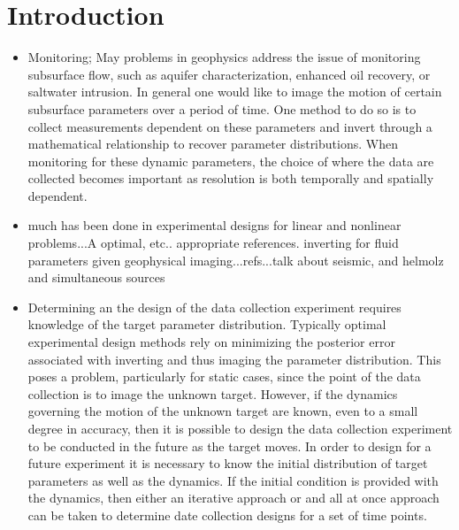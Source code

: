 \documentclass[12pt]{article}
\begin{document}
\section{Introduction} 
\begin{itemize}

\item Monitoring; May problems in geophysics address the issue of monitoring subsurface flow, such as aquifer characterization, enhanced oil recovery, or saltwater intrusion. In general one would like to image the motion of certain subsurface parameters over a period of time.  One method to do so is to collect measurements dependent on these parameters and invert through a mathematical relationship to recover parameter distributions. When monitoring for these dynamic parameters, the choice of where the data are collected becomes important as resolution is both temporally and spatially dependent. 

\item much has been done in experimental designs for linear and nonlinear problems...A optimal, etc.. appropriate references. inverting for fluid parameters given geophysical imaging...refs...talk about seismic, and helmolz and simultaneous sources

\item Determining an the design of the data collection experiment requires knowledge of the target parameter distribution. Typically optimal experimental design methods rely on minimizing the posterior error associated with inverting and thus imaging the parameter distribution. This poses a problem, particularly for static cases, since the point of  the data collection is to image the unknown target. However, if the dynamics governing the motion of the unknown target are known, even to a small degree in accuracy, then it is possible to design the data collection experiment to be conducted in the future as the target moves. In order to design for a future experiment it is necessary to know the initial distribution of target parameters as well as the dynamics. If the initial condition is provided with the dynamics, then either an iterative approach or and all at once approach can be taken to determine date collection designs for a set of time points. 


\end{itemize}
\end{document}
